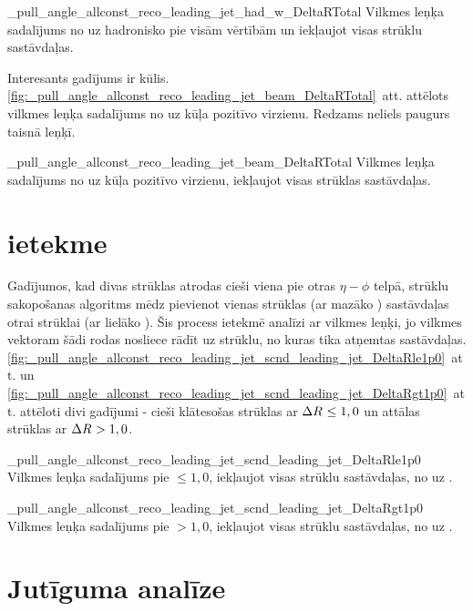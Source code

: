           {_pull_angle_allconst_reco_leading_jet_had_w_DeltaRTotal}
          {Vilkmes leņķa sadalījums no \leadingjet uz hadronisko \PW pie visām \DeltaR vērtībām un iekļaujot visas strūklu sastāvdaļas.}

Interesants gadījums ir kūlis. \ref{fig:_pull_angle_allconst_reco_leading_jet_beam_DeltaRTotal}~att. attēlots vilkmes leņķa sadalījums no \leadingjet uz kūļa pozitīvo virzienu. Redzams neliels paugurs taisnā leņķī.

          {_pull_angle_allconst_reco_leading_jet_beam_DeltaRTotal}
          {Vilkmes leņķa sadalījums no \leadingjet uz kūļa pozitīvo virzienu, iekļaujot visas strūklas sastāvdaļas.}

\section{\DeltaR ietekme}

Gadījumos, kad divas strūklas atrodas cieši viena pie otras $\eta-\phi$ telpā, strūklu sakopošanas algoritms mēdz pievienot vienas strūklas (ar mazāko \pt) sastāvdaļas otrai strūklai (ar lielāko \pt). Šis process ietekmē analīzi ar vilkmes leņķi, jo vilkmes vektoram šādi rodas nosliece rādīt uz strūklu, no kuras tika atņemtas sastāvdaļas. \ref{fig:_pull_angle_allconst_reco_leading_jet_scnd_leading_jet_DeltaRle1p0}~att. un \ref{fig:_pull_angle_allconst_reco_leading_jet_scnd_leading_jet_DeltaRgt1p0}~att. attēloti divi gadījumi - cieši klātesošas strūklas ar $\Delta R^{}\leq1,0$ un attālas strūklas ar $\Delta R^{}>1,0$.

          {_pull_angle_allconst_reco_leading_jet_scnd_leading_jet_DeltaRle1p0}
          {Vilkmes leņķa sadalījums pie \DeltaR$\leq1,0$, iekļaujot visas strūklu sastāvdaļas, no \leadingjet uz \scndleadingjet.}

          {_pull_angle_allconst_reco_leading_jet_scnd_leading_jet_DeltaRgt1p0}
          {Vilkmes leņķa sadalījums pie \DeltaR$>1,0$, iekļaujot visas strūklu sastāvdaļas, no \leadingjet uz \scndleadingjet.}


\section{Jutīguma analīze}

